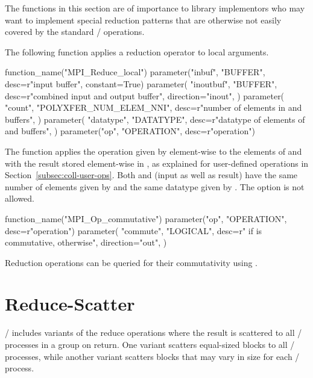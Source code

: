 The functions in this section are of importance to library implementors
who may want to implement special reduction patterns that are otherwise
not easily covered by the standard \MPI/ operations.

The following function applies a reduction operator to local arguments.

%
\begin{mpi-binding}
    function_name("MPI_Reduce_local")
    parameter("inbuf", "BUFFER", desc=r"input buffer", constant=True)
    parameter(
        "inoutbuf",
        "BUFFER",
        desc=r"combined input and output buffer",
        direction="inout",
    )
    parameter(
        "count",
        "POLYXFER_NUM_ELEM_NNI",
        desc=r"number of elements in  and  buffers",
    )
    parameter(
        "datatype",
        "DATATYPE",
        desc=r"datatype of elements of  and  buffers",
    )
    parameter("op", "OPERATION", desc=r"operation")
\end{mpi-binding}

The function applies the operation given by  element-wise to the elements of
 and  with the result stored element-wise in ,
as explained for user-defined operations in Section~\ref{subsec:coll-user-ops}.
Both  and  (input as well as result) have the same number
of elements given by  and the same datatype given by .
The  option is not allowed.

%
\begin{mpi-binding}
    function_name("MPI_Op_commutative")
    parameter("op", "OPERATION", desc=r"operation")
    parameter(
        "commute",
        "LOGICAL",
        desc=r" if  is commutative,  otherwise",
        direction="out",
    )
\end{mpi-binding}

Reduction operations can be queried for their commutativity using .

\section{Reduce-Scatter}
\label{sec:coll-reduce-scatter}

\MPI/ includes variants of the reduce operations where the result is scattered
to all \MPI/ processes in a group on return.
One variant scatters equal-sized blocks to all \MPI/ processes,
while another variant scatters blocks that may vary in size for each \MPI/ process.

